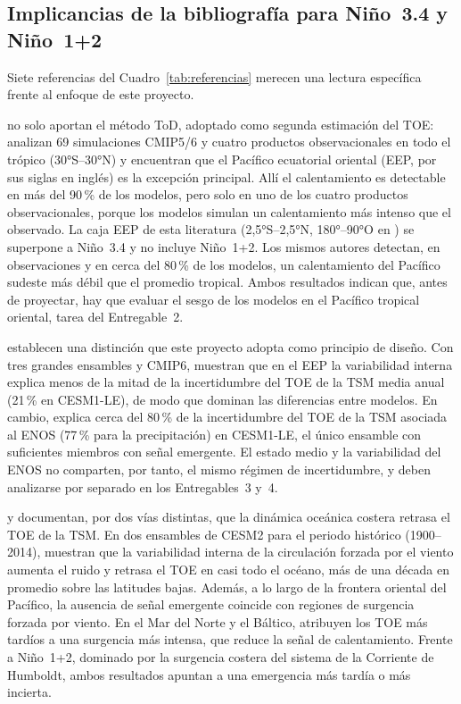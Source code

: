 \subsection{Implicancias de la bibliografía para Niño~3.4 y Niño~1+2}
\label{sec:similitudes}

Siete referencias del Cuadro~\ref{tab:referencias} merecen una lectura específica frente al enfoque de este proyecto.

\citet{gopika2024} no solo aportan el método ToD, adoptado como segunda estimación del TOE: analizan 69 simulaciones CMIP5/6 y cuatro productos observacionales en todo el trópico (30°S--30°N) y encuentran que el Pacífico ecuatorial oriental (EEP, por sus siglas en inglés) es la excepción principal. Allí el calentamiento es detectable en más del 90\,\% de los modelos, pero solo en uno de los cuatro productos observacionales, porque los modelos simulan un calentamiento más intenso que el observado. La caja EEP de esta literatura (2{,}5°S--2{,}5°N, 180°--90°O en \citealp{zhong2023}) se superpone a Niño~3.4 y no incluye Niño~1+2. Los mismos autores detectan, en observaciones y en cerca del 80\,\% de los modelos, un calentamiento del Pacífico sudeste más débil que el promedio tropical. Ambos resultados indican que, antes de proyectar, hay que evaluar el sesgo de los modelos en el Pacífico tropical oriental, tarea del Entregable~2.

\citet{zhong2023} establecen una distinción que este proyecto adopta como principio de diseño. Con tres grandes ensambles y CMIP6, muestran que en el EEP la variabilidad interna explica menos de la mitad de la incertidumbre del TOE de la TSM media anual (21\,\% en CESM1-LE), de modo que dominan las diferencias entre modelos. En cambio, explica cerca del 80\,\% de la incertidumbre del TOE de la TSM asociada al ENOS (77\,\% para la precipitación) en CESM1-LE, el único ensamble con suficientes miembros con señal emergente. El estado medio y la variabilidad del ENOS no comparten, por tanto, el mismo régimen de incertidumbre, y deben analizarse por separado en los Entregables~3 y~4.

\citet{larson2025} y \citet{poul2025} documentan, por dos vías distintas, que la dinámica oceánica costera retrasa el TOE de la TSM. En dos ensambles de CESM2 para el periodo histórico (1900--2014), \citet{larson2025} muestran que la variabilidad interna de la circulación forzada por el viento aumenta el ruido y retrasa el TOE en casi todo el océano, más de una década en promedio sobre las latitudes bajas. Además, a lo largo de la frontera oriental del Pacífico, la ausencia de señal emergente coincide con regiones de surgencia forzada por viento. En el Mar del Norte y el Báltico, \citet{poul2025} atribuyen los TOE más tardíos a una surgencia más intensa, que reduce la señal de calentamiento. Frente a Niño~1+2, dominado por la surgencia costera del sistema de la Corriente de Humboldt, ambos resultados apuntan a una emergencia más tardía o más incierta.

